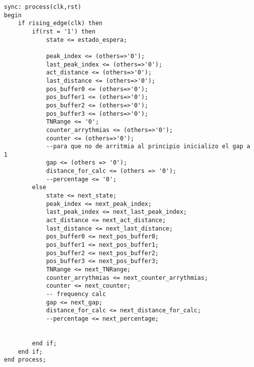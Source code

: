 \lstset{language=VHDL, breaklines=true, basicstyle=\footnotesize}
\begin{lstlisting}[frame=single]
    sync: process(clk,rst)
begin
    if rising_edge(clk) then
        if(rst = '1') then
            state <= estado_espera;
            
            peak_index <= (others=>'0');
            last_peak_index <= (others=>'0');
            act_distance <= (others=>'0');
            last_distance <= (others=>'0');
            pos_buffer0 <= (others=>'0');
            pos_buffer1 <= (others=>'0');
            pos_buffer2 <= (others=>'0');
            pos_buffer3 <= (others=>'0');
            TNRange <= '0';
            counter_arrythmias <= (others=>'0');
            counter <= (others=>'0');
            --para que no de arritmia al principio inicializo el gap a 1
            gap <= (others => '0');
            distance_for_calc <= (others => '0');
            --percentage <= '0';
        else
            state <= next_state;
            peak_index <= next_peak_index;
            last_peak_index <= next_last_peak_index;
            act_distance <= next_act_distance;
            last_distance <= next_last_distance;
            pos_buffer0 <= next_pos_buffer0;
            pos_buffer1 <= next_pos_buffer1;
            pos_buffer2 <= next_pos_buffer2;
            pos_buffer3 <= next_pos_buffer3;
            TNRange <= next_TNRange;
            counter_arrythmias <= next_counter_arrythmias;
            counter <= next_counter; 
            -- frequency calc
            gap <= next_gap;
            distance_for_calc <= next_distance_for_calc;
            --percentage <= next_percentage;
            
            
        end if;
    end if;
end process;


\end{lstlisting}

